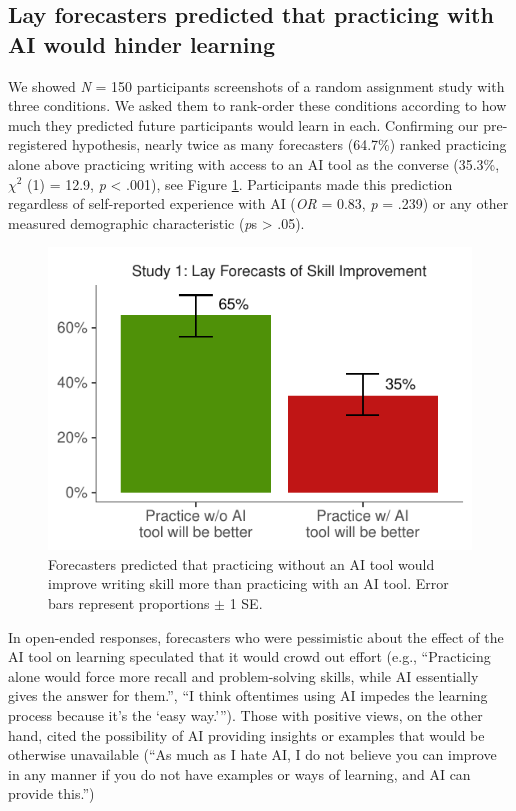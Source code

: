 \documentclass[11pt]{report}
\begin{document}
\begin{mainf}
\subsection{Lay forecasters predicted that practicing with AI would hinder learning}

We showed \textit{N} = 150 participants screenshots of a random assignment study with three conditions.
  We asked them to rank-order these conditions according to how much they predicted future participants would learn in each. 
  Confirming our pre-registered hypothesis, nearly twice as many forecasters (64.7\%) ranked practicing alone above practicing writing with access to an AI tool as the converse (35.3\%, $\chi^2$ (1) = 12.9, \textit{p} < .001), see Figure \ref{fig:s1}. 
  Participants made this prediction regardless of self-reported experience with AI (\textit{OR} = 0.83, \textit{p} = .239) or any other measured demographic characteristic (\textit{p}s > .05).
  
\begin{figure}[ht]
    \centering
    \includegraphics[width=1\linewidth]{ranking.pdf}
    \caption{Forecasters predicted that practicing without an AI tool would improve writing skill more than practicing with an AI tool. Error bars represent proportions $\pm$ 1 SE.}
    \label{fig:s1}
\end{figure}

In open-ended responses, forecasters who were pessimistic about the effect of the AI tool on learning speculated that it would crowd out effort (e.g., ``Practicing alone would force more recall and problem-solving skills, while AI essentially gives the answer for them.'', ``I think oftentimes using AI impedes the learning process because it's the `easy way.'''). Those with positive views, on the other hand, cited the possibility of AI providing insights or examples that would be otherwise unavailable (``As much as I hate AI, I do not believe you can improve in any manner if you do not have examples or ways of learning, and AI can provide this.'')




\end{mainf}
\end{document}
